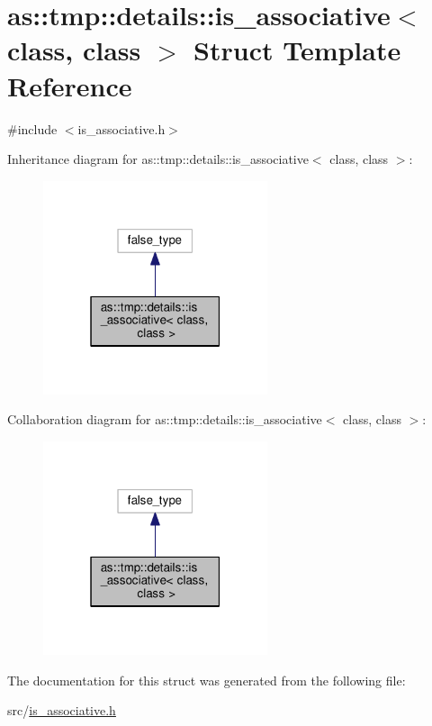 \hypertarget{structas_1_1tmp_1_1details_1_1is__associative}{}\section{as\+:\+:tmp\+:\+:details\+:\+:is\+\_\+associative$<$ class, class $>$ Struct Template Reference}
\label{structas_1_1tmp_1_1details_1_1is__associative}


{\ttfamily \#include $<$is\+\_\+associative.\+h$>$}



Inheritance diagram for as\+:\+:tmp\+:\+:details\+:\+:is\+\_\+associative$<$ class, class $>$\+:\nopagebreak
\begin{figure}[H]
\begin{center}
\leavevmode
\includegraphics[width=187pt]{structas_1_1tmp_1_1details_1_1is__associative__inherit__graph}
\end{center}
\end{figure}


Collaboration diagram for as\+:\+:tmp\+:\+:details\+:\+:is\+\_\+associative$<$ class, class $>$\+:\nopagebreak
\begin{figure}[H]
\begin{center}
\leavevmode
\includegraphics[width=187pt]{structas_1_1tmp_1_1details_1_1is__associative__coll__graph}
\end{center}
\end{figure}


The documentation for this struct was generated from the following file\+:\begin{DoxyCompactItemize}
\item 
src/\hyperlink{is__associative_8h}{is\+\_\+associative.\+h}\end{DoxyCompactItemize}
